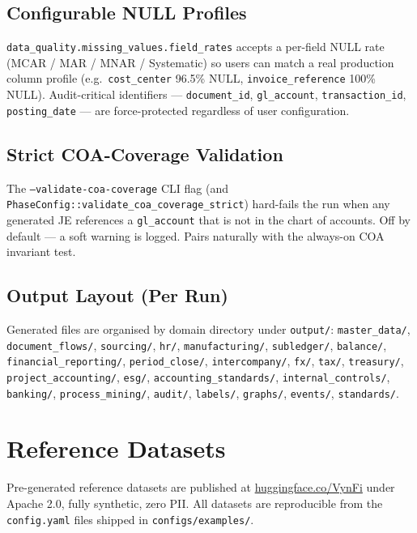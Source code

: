 \documentclass[11pt,a4paper]{article}
\begin{document}
\subsection{Configurable NULL Profiles}

\texttt{data\_quality.missing\_values.field\_rates} accepts a per-field
NULL rate (MCAR / MAR / MNAR / Systematic) so users can match a real
production column profile (e.g.\ \texttt{cost\_center} 96.5\% NULL,
\texttt{invoice\_reference} 100\% NULL). Audit-critical identifiers ---
\texttt{document\_id}, \texttt{gl\_account}, \texttt{transaction\_id},
\texttt{posting\_date} --- are force-protected regardless of user
configuration.

\subsection{Strict COA-Coverage Validation}

The \texttt{--validate-coa-coverage} CLI flag (and
\texttt{PhaseConfig::validate\_coa\_coverage\_strict}) hard-fails the run
when any generated JE references a \texttt{gl\_account} that is not in the
chart of accounts. Off by default --- a soft warning is logged. Pairs
naturally with the always-on COA invariant test.

\subsection{Output Layout (Per Run)}

Generated files are organised by domain directory under
\texttt{output/}:
\texttt{master\_data/}, \texttt{document\_flows/}, \texttt{sourcing/},
\texttt{hr/}, \texttt{manufacturing/}, \texttt{subledger/},
\texttt{balance/}, \texttt{financial\_reporting/}, \texttt{period\_close/},
\texttt{intercompany/}, \texttt{fx/}, \texttt{tax/}, \texttt{treasury/},
\texttt{project\_accounting/}, \texttt{esg/},
\texttt{accounting\_standards/}, \texttt{internal\_controls/},
\texttt{banking/}, \texttt{process\_mining/}, \texttt{audit/},
\texttt{labels/}, \texttt{graphs/}, \texttt{events/},
\texttt{standards/}.

\newpage
\section{Reference Datasets}

Pre-generated reference datasets are published at
\href{https://huggingface.co/VynFi}{huggingface.co/VynFi} under Apache 2.0,
fully synthetic, zero PII. All datasets are reproducible from the
\texttt{config.yaml} files shipped in \texttt{configs/examples/}.
\end{document}
